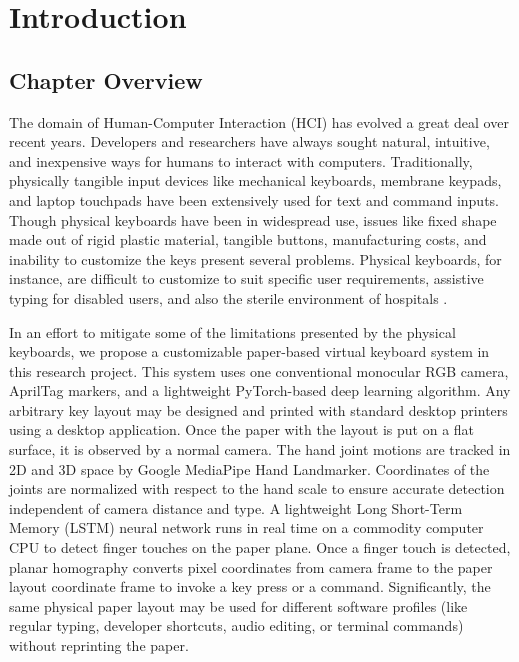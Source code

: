 \chapter{Introduction}
\label{ch:introduction}

\section{Chapter Overview}
\label{sec:chapter_overview}
The domain of Human-Computer Interaction (HCI) has evolved a great deal over recent years. Developers and researchers have always sought natural, intuitive, and inexpensive ways for humans to interact with computers. Traditionally, physically tangible input devices like mechanical keyboards, membrane keypads, and laptop touchpads have been extensively used for text and command inputs. Though physical keyboards have been in widespread use, issues like fixed shape made out of rigid plastic material, tangible buttons, manufacturing costs, and inability to customize the keys present several problems. Physical keyboards, for instance, are difficult to customize to suit specific user requirements, assistive typing for disabled users, and also the sterile environment of hospitals \cite{ReviewVirtualKeyboard2020, Lee2022Virtual}.

In an effort to mitigate some of the limitations presented by the physical keyboards, we propose a customizable paper-based virtual keyboard system in this research project. This system uses one conventional monocular RGB camera, AprilTag markers, and a lightweight PyTorch-based deep learning algorithm. Any arbitrary key layout may be designed and printed with standard desktop printers using a desktop application. Once the paper with the layout is put on a flat surface, it is observed by a normal camera. The hand joint motions are tracked in 2D and 3D space by Google MediaPipe Hand Landmarker. Coordinates of the joints are normalized with respect to the hand scale to ensure accurate detection independent of camera distance and type. A lightweight Long Short-Term Memory (LSTM) neural network runs in real time on a commodity computer CPU to detect finger touches on the paper plane. Once a finger touch is detected, planar homography converts pixel coordinates from camera frame to the paper layout coordinate frame to invoke a key press or a command. Significantly, the same physical paper layout may be used for different software profiles (like regular typing, developer shortcuts, audio editing, or terminal commands) without reprinting the paper.

